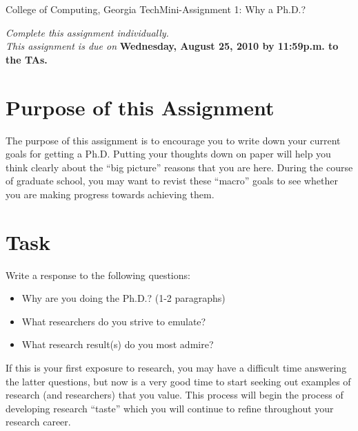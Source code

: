 \documentclass[11pt]{article}
\begin{document}


{College of Computing, Georgia Tech}{Mini-Assignment 1: Why a Ph.D.?}

{\em Complete this assignment individually. \\  This
  assignment is due on} {\bf Wednesday, August 25, 2010 by 11:59p.m. to
  the TAs.}

\section{Purpose of this Assignment}

The purpose of this assignment is to encourage you to write down your
current goals for getting a Ph.D.  Putting your thoughts down on paper
will help you think clearly about the ``big picture'' reasons that you
are here.  During the course of graduate school, you may want to revist
these ``macro'' goals to see whether you are making progress towards
achieving them.

\section{Task}

Write a response to the following questions:
\begin{itemize}
\itemsep=-1pt
    \item Why are you doing the Ph.D.? (1-2 paragraphs)
    \item What researchers do you strive to emulate?
    \item What research result(s) do you most admire?
\end{itemize}
\noindent
If this is your first exposure to research, you may have a difficult
time answering the latter questions, but now is a very good time to
start seeking out examples of research (and researchers) that you
value.  This process will begin the process of developing
research ``taste'' which you will continue to refine throughout your
research career.
\end{document}
